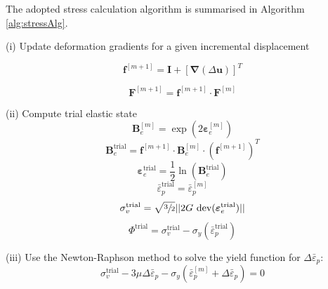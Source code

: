 \documentclass[sn-mathphys,Numbered,draft]{sn-jnl}%
\newcommand{\bb}{\boldsymbol}
\begin{document}
The adopted stress calculation algorithm \citep{de_souza_neto_computational_2008} is summarised in Algorithm \ref{alg:stressAlg}.

\begin{algorithm}[htb] \label{alg:stressAlg}
\SetAlgoLined
(i) Update deformation gradients for a given incremental displacement

\begin{equation}
  \mathbf{f}^{[m+1]} = \mathbf{I} + \left[ \bb{\nabla}(\Delta\textbf{u}) \right]^T \nonumber
\end{equation}

\begin{equation}
  \mathbf{F}^{[m+1]} = \mathbf{f}^{[m+1]} \cdot \mathbf{F}^{[m]}  \nonumber
\end{equation}

(ii) Compute trial elastic state
\begin{equation}
\mathbf{B}_{e}^{[m]} = \exp\left({2\boldsymbol{\varepsilon}_{e}^{[m]}}\right) \nonumber
\end{equation}
\begin{equation}
\mathbf{B}_{e}^{\text{trial}} = \mathbf{f}^{[m+1]} \cdot \mathbf{B}_{e}^{[m]} \cdot (\mathbf{f}^{[m+1]})^{T}\nonumber
\end{equation}
\begin{equation}
\boldsymbol{\varepsilon}_{e}^{\text{trial}} = \frac{1}{2} \ln(\textbf{B}_{e}^{\text{trial}}) \nonumber
\end{equation}
\begin{equation}
\bar{\varepsilon}^{\text{trial}}_p = \bar{\varepsilon}^{[m]}_p \nonumber
\end{equation}
\begin{equation}
\sigma_{v}^{\text{trial}} = \sqrt{\sfrac{3}{2}} || 2G\ \text{dev}(\boldsymbol{\varepsilon}_{e}^{\text{trial}})|| \nonumber
\end{equation}
\begin{equation}
\Phi^{\text{trial}} =  \sigma_{v}^{\text{trial}} - \sigma_{y}(\bar{\varepsilon}^{\text{trial}}_p) \nonumber 
\end{equation}

(iii) Use the Newton-Raphson method to solve the yield function for $\Delta\bar{\varepsilon}_p$:
\begin{equation}
	\sigma_{v}^{\text{trial}} 
	- 3\mu \Delta\bar{\varepsilon}_p
	-\sigma_{y}(\bar{\varepsilon}^{[m]}_p + \Delta\bar{\varepsilon}_p) = 0 \nonumber
\end{equation}


\end{algorithm}
\end{document}
